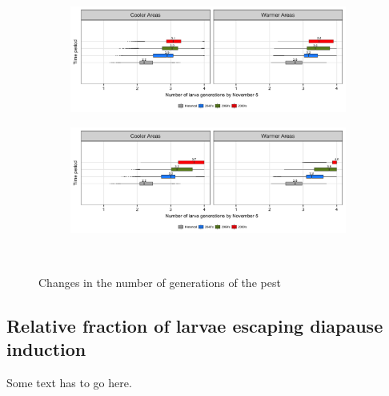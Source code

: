 \documentclass[12pt]{article}
\theoremstyle{plain}
\theoremstyle{definition}
\theoremstyle{definition}
\begin{document}
\begin{figure}[h!]
          \begin{subfigure}[b]{0.45\textwidth}
        \includegraphics[width=\textwidth]{figures/Larva_Gen_Nov_rcp45}
    \end{subfigure}
    \begin{subfigure}[b]{0.45\textwidth}
        \includegraphics[width=\textwidth]{figures/Larva_Gen_Nov_rcp85}
    \end{subfigure}\\
    \caption{Changes in the number of generations of the pest}\label{fig:CNGP}
\end{figure}

\pagebreak


\subsection{Relative fraction of larvae escaping diapause induction}
Some text has to go here.
\end{document}
